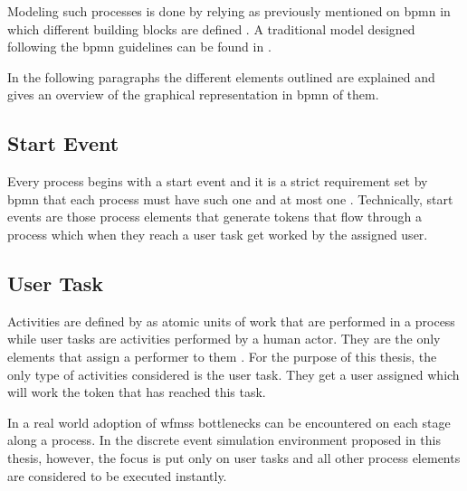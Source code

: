 Modeling such processes is done by relying as previously mentioned on \gls{bpmn} in which different building blocks are defined \citep{Silver2011}. A traditional model designed following the \gls{bpmn} guidelines can be found in .


In the following paragraphs the different elements outlined are explained and  gives an overview of the graphical representation in \gls{bpmn} of them.


\subsection{Start Event}

Every process begins with a start event and it is a strict requirement set by \gls{bpmn} that each process must have such one and at most one \citep{Silver2011}. Technically, start events are those process elements that generate tokens that flow through a process which when they reach a user task get worked by the assigned user.

\subsection{User Task}

Activities are defined by \citet{Silver2011} as atomic units of work that are performed in a process while user tasks are activities performed by a human actor. They are the only elements that assign a performer to them \citep{Silver2011}. For the purpose of this thesis, the only type of activities considered is the user task. They get a user assigned which will work the token that has reached this task. 

In a real world adoption of \glspl{wfms} bottlenecks can be encountered on each stage along a process. In the discrete event simulation environment proposed in this thesis, however, the focus is put only on user tasks and all other process elements are considered to be executed instantly.

